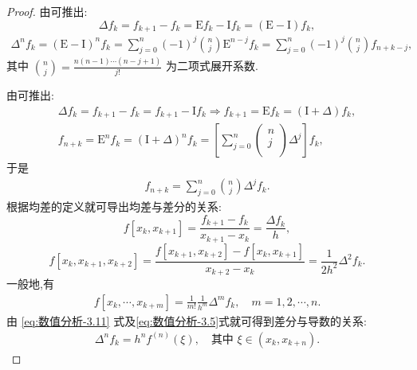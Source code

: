 \documentclass[../../main.tex]{subfiles}
\begin{document}
\begin{proof}
由可推出:
\[
\Delta f_k = f_{k+1} - f_k = \mathrm{E}f_k - \mathrm{I}f_k = (\mathrm{E} - \mathrm{I})f_k,
\]
\begin{align*}
\Delta^n f_k = (\mathrm{E} - \mathrm{I})^n f_k = \sum_{j=0}^n (-1)^j \binom{n}{j} \mathrm{E}^{n-j} f_k = \sum_{j=0}^n (-1)^j \binom{n}{j} f_{n+k-j},
\end{align*}
其中 $\binom{n}{j} = \frac{n(n-1)\cdots(n-j+1)}{j!}$ 为二项式展开系数.

由可推出:
\begin{gather*}
\Delta f_k=f_{k+1}-f_k=f_{k+1}-\mathrm{I}f_k\Longrightarrow f_{k+1}=\mathrm{E}f_k=(\mathrm{I}+\Delta )f_k,
\\
f_{n+k}=\mathrm{E}^nf_k=(\mathrm{I}+\Delta )^nf_k=\left[ \sum_{j=0}^n{\left( \begin{array}{c}
n\\
j\\
\end{array} \right) \Delta ^j} \right] f_k,
\end{gather*}
于是
\begin{align*}
f_{n+k} = \sum_{j=0}^n \binom{n}{j} \Delta^j f_k.
\end{align*}
根据均差的定义就可导出均差与差分的关系:
\[
f[x_k, x_{k+1}] = \frac{f_{k+1} - f_k}{x_{k+1} - x_k} = \frac{\Delta f_k}{h},
\]
\[
f[x_k, x_{k+1}, x_{k+2}] = \frac{f[x_{k+1}, x_{k+2}] - f[x_k, x_{k+1}]}{x_{k+2} - x_k} = \frac{1}{2h^2} \Delta^2 f_k.
\]
一般地,有
\begin{align*}
f[x_k, \cdots, x_{k+m}] = \frac{1}{m!} \frac{1}{h^m} \Delta^m f_k, \quad m = 1, 2, \cdots, n. 
\end{align*}
由 \eqref{eq:数值分析-3.11} 式及\eqref{eq:数值分析-3.5}式就可得到差分与导数的关系:
\begin{align*}
\Delta^n f_k = h^n f^{(n)}(\xi), \quad \text{其中 } \xi \in (x_k, x_{k+n}).
\end{align*}
\end{proof}
\end{document}
